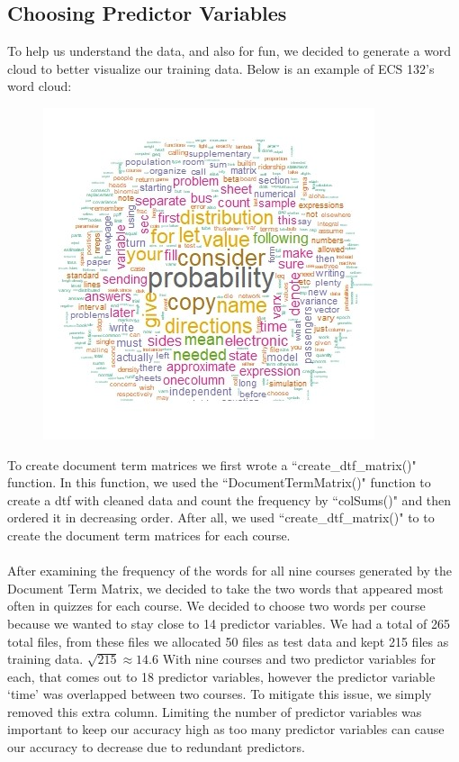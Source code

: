 \documentclass{article}
\begin{document}
    \subsection{Choosing Predictor Variables}
    To help us understand the data, and also for fun, we decided to generate a word cloud to better visualize our training data. Below is an example of ECS 132's word cloud:
        \begin{figure}
        \centering
        \includegraphics[scale=1]{ECS132.jpeg}\\
        \end{figure}
    
    To create document term matrices we first wrote a ``create\_dtf\_matrix()" function. In this function, we used the ``DocumentTermMatrix()" function to create a dtf with cleaned data and count the frequency by ``colSums()" and then ordered it in decreasing order. After all, we used ``create\_dtf\_matrix()" to to create the document term matrices for each course.
        \\\\
        After examining the frequency of the words for all nine courses generated by the Document Term Matrix, we decided to take the two words that appeared most often in quizzes for each course. We decided to choose two words per course because we wanted to stay close to 14 predictor variables. We had a total of 265 total files, from these files we allocated 50 files as test data and kept 215 files as training data. $\sqrt{215} \approx 14.6$ With nine courses and two predictor variables for each, that comes out to 18 predictor variables, however the predictor variable `time' was overlapped between two courses. To mitigate this issue, we simply removed this extra column. Limiting the number of predictor variables was important to keep our accuracy high as too many predictor variables can cause our accuracy to decrease due to redundant predictors. 
    
\end{document}
